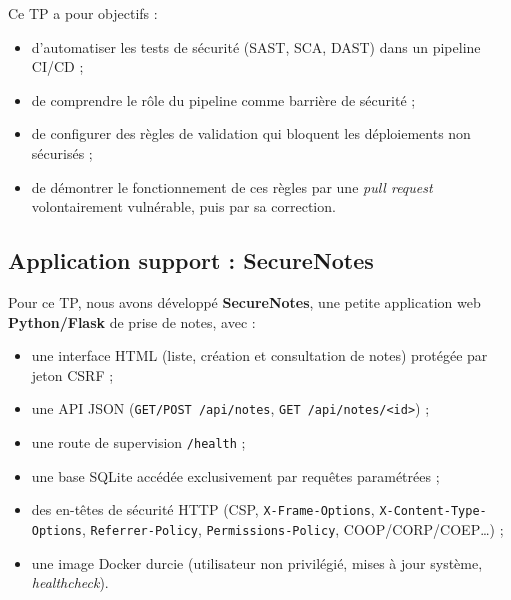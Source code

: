 \documentclass[11pt,a4paper]{article}
\newcommand{\fichier}[1]{\texttt{#1}}
\begin{document}
Ce TP a pour objectifs :
\begin{itemize}[itemsep=2pt]
  \item d'automatiser les tests de sécurité (SAST, SCA, DAST) dans un pipeline CI/CD ;
  \item de comprendre le rôle du pipeline comme barrière de sécurité ;
  \item de configurer des règles de validation qui bloquent les déploiements non sécurisés ;
  \item de démontrer le fonctionnement de ces règles par une \emph{pull request} volontairement
        vulnérable, puis par sa correction.
\end{itemize}

\subsection{Application support : SecureNotes}

Pour ce TP, nous avons développé \textbf{SecureNotes}, une petite application web
\textbf{Python/Flask} de prise de notes, avec :
\begin{itemize}[itemsep=2pt]
  \item une interface HTML (liste, création et consultation de notes) protégée par jeton CSRF ;
  \item une API JSON (\fichier{GET/POST /api/notes}, \fichier{GET /api/notes/<id>}) ;
  \item une route de supervision \fichier{/health} ;
  \item une base SQLite accédée exclusivement par requêtes paramétrées ;
  \item des en-têtes de sécurité HTTP (CSP, \fichier{X-Frame-Options}, \fichier{X-Content-Type-Options},
        \fichier{Referrer-Policy}, \fichier{Permissions-Policy}, COOP/CORP/COEP\ldots) ;
  \item une image Docker durcie (utilisateur non privilégié, mises à jour système, \emph{healthcheck}).
\end{itemize}
\end{document}

